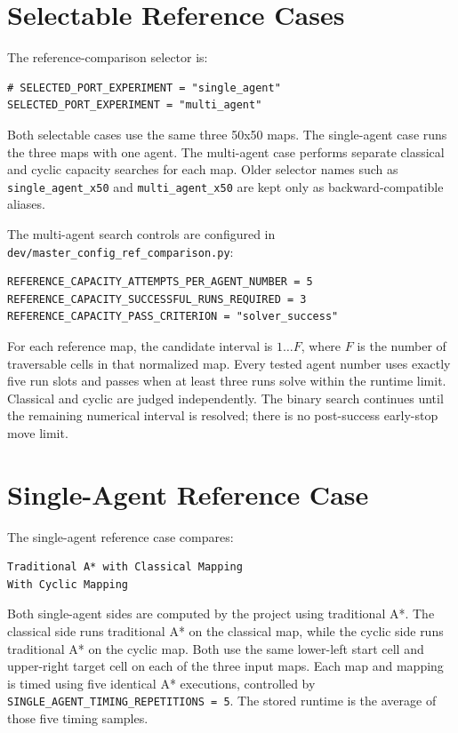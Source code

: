 \documentclass[11pt]{article}
\begin{document}
\section{Selectable Reference Cases}

The reference-comparison selector is:

\begin{lstlisting}
# SELECTED_PORT_EXPERIMENT = "single_agent"
SELECTED_PORT_EXPERIMENT = "multi_agent"
\end{lstlisting}

Both selectable cases use the same three 50x50 maps. The single-agent case runs the three maps with one agent. The multi-agent case performs separate classical and cyclic capacity searches for each map. Older selector names such as \texttt{single\_agent\_x50} and \texttt{multi\_agent\_x50} are kept only as backward-compatible aliases.

The multi-agent search controls are configured in \texttt{dev/master\_config\_ref\_comparison.py}:

\begin{lstlisting}
REFERENCE_CAPACITY_ATTEMPTS_PER_AGENT_NUMBER = 5
REFERENCE_CAPACITY_SUCCESSFUL_RUNS_REQUIRED = 3
REFERENCE_CAPACITY_PASS_CRITERION = "solver_success"
\end{lstlisting}

For each reference map, the candidate interval is $1\ldots F$, where $F$ is the number of traversable cells in that normalized map. Every tested agent number uses exactly five run slots and passes when at least three runs solve within the runtime limit. Classical and cyclic are judged independently. The binary search continues until the remaining numerical interval is resolved; there is no post-success early-stop move limit.

\section{Single-Agent Reference Case}

The single-agent reference case compares:

\begin{lstlisting}
Traditional A* with Classical Mapping
With Cyclic Mapping
\end{lstlisting}

Both single-agent sides are computed by the project using traditional A*. The classical side runs traditional A* on the classical map, while the cyclic side runs traditional A* on the cyclic map. Both use the same lower-left start cell and upper-right target cell on each of the three input maps. Each map and mapping is timed using five identical A* executions, controlled by \texttt{SINGLE\_AGENT\_TIMING\_REPETITIONS = 5}. The stored runtime is the average of those five timing samples.
\end{document}
